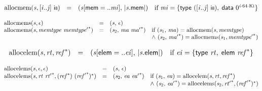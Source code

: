 $$
\begin{array}{@{}lcl@{}l@{}}
{\mathrm{allocmem}}({\mathit{s}}, {}[{\mathit{i}} .. {\mathit{j}}]~\mathsf{i{\scriptstyle8}}) &=& ({\mathit{s}}{}[\mathsf{mem} = ..{\mathit{mi}}],\, {|{\mathit{s}}.\mathsf{mem}|}) &\quad
  \mbox{if}~{\mathit{mi}} = \{ \begin{array}[t]{@{}l@{}}
\mathsf{type}~({}[{\mathit{i}} .. {\mathit{j}}]~\mathsf{i{\scriptstyle8}}),\; \mathsf{data}~{0^{{\mathit{i}} \cdot 64 \cdot {\mathrm{Ki}}}} \}\end{array} \\
\end{array}
$$

$$
\begin{array}{@{}lcl@{}l@{}}
{\mathrm{allocmems}}({\mathit{s}}, \epsilon) &=& ({\mathit{s}},\, \epsilon) &  \\
{\mathrm{allocmems}}({\mathit{s}}, {\mathit{memtype}}~{{\mathit{memtype}'}^\ast}) &=& ({\mathit{s}}_{{2}},\, {\mathit{ma}}~{{\mathit{ma}'}^\ast}) &\quad
  \mbox{if}~({\mathit{s}}_{{1}},\, {\mathit{ma}}) = {\mathrm{allocmem}}({\mathit{s}}, {\mathit{memtype}}) \\
 &&&\quad {\land}~({\mathit{s}}_{{2}},\, {{\mathit{ma}'}^\ast}) = {\mathrm{allocmems}}({\mathit{s}}_{{1}}, {{\mathit{memtype}'}^\ast}) \\
\end{array}
$$

$$
\begin{array}{@{}lcl@{}l@{}}
{\mathrm{allocelem}}({\mathit{s}}, {\mathit{rt}}, {{\mathit{ref}}^\ast}) &=& ({\mathit{s}}{}[\mathsf{elem} = ..{\mathit{ei}}],\, {|{\mathit{s}}.\mathsf{elem}|}) &\quad
  \mbox{if}~{\mathit{ei}} = \{ \begin{array}[t]{@{}l@{}}
\mathsf{type}~{\mathit{rt}},\; \mathsf{elem}~{{\mathit{ref}}^\ast} \}\end{array} \\
\end{array}
$$

$$
\begin{array}{@{}lcl@{}l@{}}
{\mathrm{allocelems}}({\mathit{s}}, \epsilon, \epsilon) &=& ({\mathit{s}},\, \epsilon) &  \\
{\mathrm{allocelems}}({\mathit{s}}, {\mathit{rt}}~{{\mathit{rt}'}^\ast}, ({{\mathit{ref}}^\ast})~{({{\mathit{ref}'}^\ast})^\ast}) &=& ({\mathit{s}}_{{2}},\, {\mathit{ea}}~{{\mathit{ea}'}^\ast}) &\quad
  \mbox{if}~({\mathit{s}}_{{1}},\, {\mathit{ea}}) = {\mathrm{allocelem}}({\mathit{s}}, {\mathit{rt}}, {{\mathit{ref}}^\ast}) \\
 &&&\quad {\land}~({\mathit{s}}_{{2}},\, {{\mathit{ea}'}^\ast}) = {\mathrm{allocelems}}({\mathit{s}}_{{2}}, {{\mathit{rt}'}^\ast}, {({{\mathit{ref}'}^\ast})^\ast}) \\
\end{array}
$$

